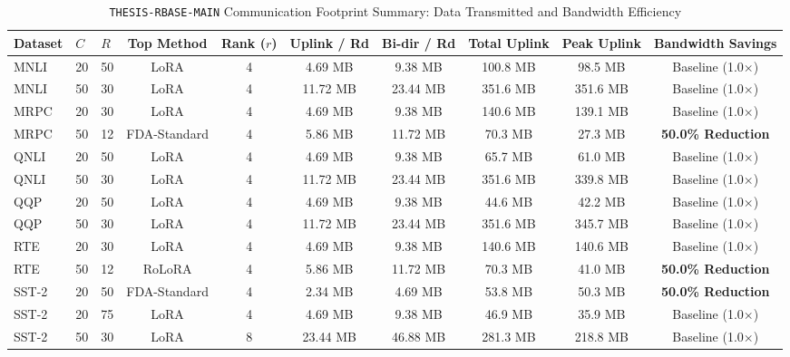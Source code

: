 \documentclass[10pt,a4paper]{article}
\begin{document}
\begin{table}[H]
\centering
\caption{\texttt{THESIS-RBASE-MAIN} Communication Footprint Summary: Data Transmitted and Bandwidth Efficiency}
\label{tab:global_comm_summary}
\scriptsize
\setlength{\tabcolsep}{3.0pt}
\begin{tabular*}{\textwidth}{@{\extracolsep{\fill}}lllccccccc@{}}
\toprule
\textbf{Dataset} & \textbf{$C$} & \textbf{$R$} & \textbf{Top Method} & \textbf{Rank ($r$)} & \textbf{Uplink / Rd} & \textbf{Bi-dir / Rd} & \textbf{Total Uplink} & \textbf{Peak Uplink} & \textbf{Bandwidth Savings} \\
\midrule
MNLI & 20 & 50 & LoRA & 4 & 4.69 MB & 9.38 MB & 100.8 MB & 98.5 MB & Baseline (1.0$\times$) \\ 
MNLI & 50 & 30 & LoRA & 4 & 11.72 MB & 23.44 MB & 351.6 MB & 351.6 MB & Baseline (1.0$\times$) \\ 
MRPC & 20 & 30 & LoRA & 4 & 4.69 MB & 9.38 MB & 140.6 MB & 139.1 MB & Baseline (1.0$\times$) \\ 
MRPC & 50 & 12 & FDA-Standard & 4 & 5.86 MB & 11.72 MB & 70.3 MB & 27.3 MB & \textbf{50.0\% Reduction} \\ 
QNLI & 20 & 50 & LoRA & 4 & 4.69 MB & 9.38 MB & 65.7 MB & 61.0 MB & Baseline (1.0$\times$) \\ 
QNLI & 50 & 30 & LoRA & 4 & 11.72 MB & 23.44 MB & 351.6 MB & 339.8 MB & Baseline (1.0$\times$) \\ 
QQP & 20 & 50 & LoRA & 4 & 4.69 MB & 9.38 MB & 44.6 MB & 42.2 MB & Baseline (1.0$\times$) \\ 
QQP & 50 & 30 & LoRA & 4 & 11.72 MB & 23.44 MB & 351.6 MB & 345.7 MB & Baseline (1.0$\times$) \\ 
RTE & 20 & 30 & LoRA & 4 & 4.69 MB & 9.38 MB & 140.6 MB & 140.6 MB & Baseline (1.0$\times$) \\ 
RTE & 50 & 12 & RoLoRA & 4 & 5.86 MB & 11.72 MB & 70.3 MB & 41.0 MB & \textbf{50.0\% Reduction} \\ 
SST-2 & 20 & 50 & FDA-Standard & 4 & 2.34 MB & 4.69 MB & 53.8 MB & 50.3 MB & \textbf{50.0\% Reduction} \\ 
SST-2 & 20 & 75 & LoRA & 4 & 4.69 MB & 9.38 MB & 46.9 MB & 35.9 MB & Baseline (1.0$\times$) \\ 
SST-2 & 50 & 30 & LoRA & 8 & 23.44 MB & 46.88 MB & 281.3 MB & 218.8 MB & Baseline (1.0$\times$) \\ 
\bottomrule
\end{tabular*}
\end{table}

\vspace{0.6em}
\end{document}
